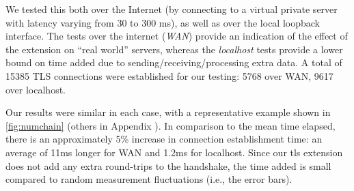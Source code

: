 We tested this both over the Internet (by connecting to a virtual private server
with latency varying from 30 to 300 ms), as well as over the local loopback
interface. The tests over the internet (\emph{WAN}) provide an indication of the
effect of the extension on ``real world'' servers, whereas the \emph{localhost}
tests provide a lower bound on time added due to sending/receiving/processing
extra data. A total of 15385 TLS connections were established for our testing:
5768 over WAN, 9617 over localhost.

Our results were similar in each case, with a representative example shown in
\autoref{fig:numchain} (others in Appendix ). In comparison to the
mean time elapsed, there is an approximately 5\% increase in connection
establishment time: an average of 11ms longer for WAN and 1.2ms for localhost.
Since our \ac{tls} extension does not add any extra round-trips to the
handshake, the time added is small compared to random
measurement fluctuations (i.e., the error bars).

